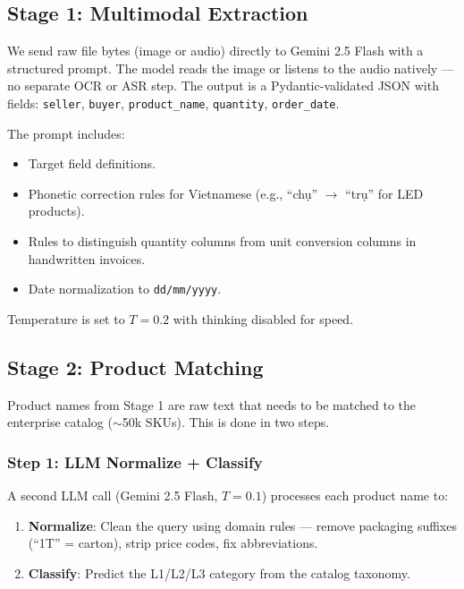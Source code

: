 \FloatBarrier

\subsection{Stage 1: Multimodal Extraction}

We send raw file bytes (image or audio) directly to Gemini 2.5 Flash with a structured prompt. The model reads the image or listens to the audio natively — no separate OCR or ASR step. The output is a Pydantic-validated JSON with fields: \texttt{seller}, \texttt{buyer}, \texttt{product\_name}, \texttt{quantity}, \texttt{order\_date}.

The prompt includes:
\begin{itemize}
    \item Target field definitions.
    \item Phonetic correction rules for Vietnamese (e.g., ``ch\d{u}'' $\to$ ``tr\d{u}'' for LED products).
    \item Rules to distinguish quantity columns from unit conversion columns in handwritten invoices.
    \item Date normalization to \texttt{dd/mm/yyyy}.
\end{itemize}

Temperature is set to $T = 0.2$ with thinking disabled for speed.

\subsection{Stage 2: Product Matching}

Product names from Stage 1 are raw text that needs to be matched to the enterprise catalog ($\sim$50k SKUs). This is done in two steps.

\subsubsection{Step 1: LLM Normalize + Classify}

A second LLM call (Gemini 2.5 Flash, $T = 0.1$) processes each product name to:
\begin{enumerate}
    \item \textbf{Normalize}: Clean the query using domain rules — remove packaging suffixes (``1T'' = carton), strip price codes, fix abbreviations.
    \item \textbf{Classify}: Predict the L1/L2/L3 category from the catalog taxonomy.
\end{enumerate}

